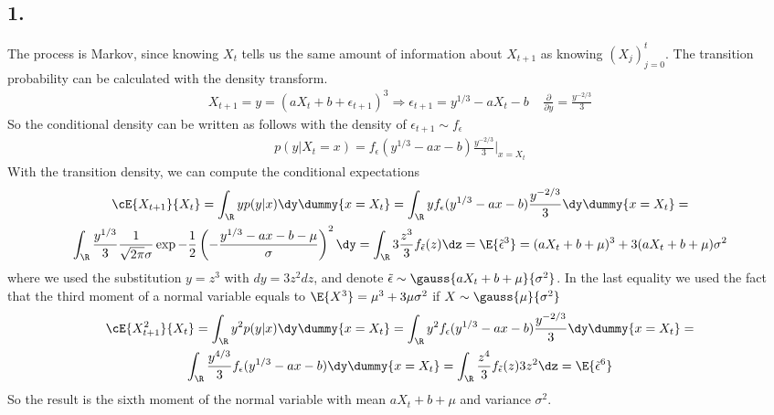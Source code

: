 \subsection*{1.}
The process is Markov, since knowing $X_t$ tells us the same amount of information about $X_{t+1}$ as knowing $(X_j)_{j=0}^t$. The transition probability can be calculated with the density transform. 
\begin{gather*}
X_{t+1}=y=(aX_t+b+\epsilon_{t+1})^3 \Longrightarrow \epsilon_{t+1}=y^{1/3}-aX_t-b ~~~~~ \frac{\partial}{\partial y}= \frac{y^{-2/3}}{3}    
\end{gather*}
So the conditional density can be written as follows with the density of $\epsilon_{t+1} \sim f_\epsilon$
\begin{gather*}
    p(y|X_t=x)=f_{\epsilon}(y^{1/3}-ax-b)\frac{y^{-2/3}}{3} \bigg \rvert_{x=X_{t}}
\end{gather*}
With the transition density, we can compute the conditional expectations
\begin{gather*}
    \cE{X_{t+1}}{X_t}=\int_{\R}y p(y|x)\dy\dummy{x=X_t}=\int_{\R}yf_{\epsilon}(y^{1/3}-ax-b)\frac{y^{-2/3}}{3}\dy\dummy{x=X_t}=\\
    \int_{\R}\frac{y^{1/3}}{3}\frac{1}{\sqrt{2\pi}\sigma}\exp-\frac{1}{2}\left(
    -\frac{y^{1/3}-ax-b-\mu}{\sigma}  \right)^2 \dy= \int_{\R} 3 \frac{z^3}{3}f_{\tilde{\epsilon}}(z)\dz = \E{\tilde{\epsilon}^3}=(aX_t+b+\mu)^3+3(aX_t+b+\mu)\sigma^2 
\end{gather*}
where we used the substitution $y=z^3$ with $dy=3z^2dz$, and denote $\tilde{\epsilon}\sim\gauss{aX_t+b+\mu}{\sigma^2}$. In the last equality we used the fact that the third moment of a normal variable equals to $\E{X^3}=\mu^3+3\mu\sigma^2$ if $X\sim\gauss{\mu}{\sigma^2}$
\begin{gather*}
    \cE{X_{t+1}^2}{X_t}=\int_{\R}y^2 p(y|x)\dy\dummy{x=X_t}= \int_{\R}y^2f_{\epsilon}(y^{1/3}-ax-b)\frac{y^{-2/3}}{3}\dy\dummy{x=X_t}=\\
    \int_{\R}\frac{y^{4/3}}{3}f_{\epsilon}(y^{1/3}-ax-b)\dy\dummy{x=X_t}=
    \int_{\R}\frac{z^{4}}{3}f_{\tilde{\epsilon}}(z)3z^2\dz = \E{\tilde{\epsilon}^6}
\end{gather*}
So the result is the sixth moment of the normal variable with mean $aX_t+b+\mu$ and variance $\sigma^2$.

